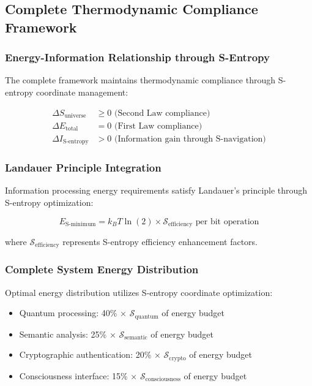 \documentclass[12pt,a4paper]{article}
\begin{document}
{\subsection{Complete Thermodynamic Compliance Framework}

\subsubsection{Energy-Information Relationship through S-Entropy}

The complete framework maintains thermodynamic compliance through S-entropy coordinate management:

\begin{align}
\Delta S_{\text{universe}} &\geq 0 \text{ (Second Law compliance)} \\
\Delta E_{\text{total}} &= 0 \text{ (First Law compliance)} \\
\Delta I_{\text{S-entropy}} &> 0 \text{ (Information gain through S-navigation)}
\end{align}

\subsubsection{Landauer Principle Integration}

Information processing energy requirements satisfy Landauer's principle through S-entropy optimization:

\begin{equation}
E_{\text{S-minimum}} = k_B T \ln(2) \times \mathcal{S}_{\text{efficiency}} \text{ per bit operation}
\end{equation}

where $\mathcal{S}_{\text{efficiency}}$ represents S-entropy efficiency enhancement factors.

\subsubsection{Complete System Energy Distribution}

Optimal energy distribution utilizes S-entropy coordinate optimization:

\begin{itemize}
\item Quantum processing: 40\% × $\mathcal{S}_{\text{quantum}}$ of energy budget
\item Semantic analysis: 25\% × $\mathcal{S}_{\text{semantic}}$ of energy budget
\item Cryptographic authentication: 20\% × $\mathcal{S}_{\text{crypto}}$ of energy budget
\item Consciousness interface: 15\% × $\mathcal{S}_{\text{consciousness}}$ of energy budget
\end{itemize}

}
\end{document}
